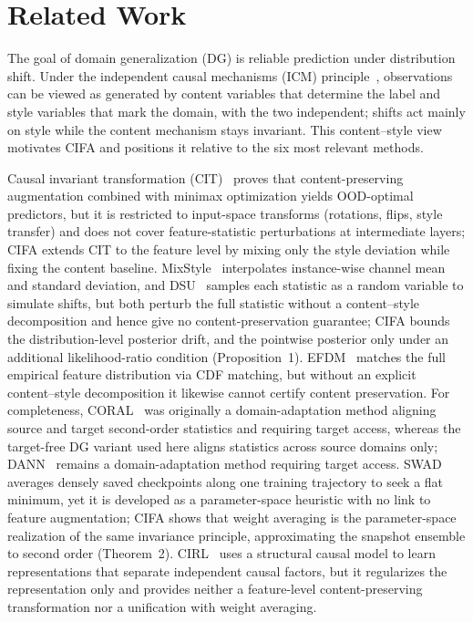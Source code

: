 \documentclass[electronics,article,submit,moreauthors]{Definitions/mdpi}
\begin{document}
\section{Related Work}

The goal of domain generalization (DG) is reliable prediction under distribution shift. Under the independent causal mechanisms (ICM) principle~\citep{ref5,ref6}, observations can be viewed as generated by content variables that determine the label and style variables that mark the domain, with the two independent; shifts act mainly on style while the content mechanism stays invariant. This content--style view motivates CIFA and positions it relative to the six most relevant methods.

Causal invariant transformation (CIT)~\citep{ref22} proves that content-preserving augmentation combined with minimax optimization yields OOD-optimal predictors, but it is restricted to input-space transforms (rotations, flips, style transfer) and does not cover feature-statistic perturbations at intermediate layers; CIFA extends CIT to the feature level by mixing only the style deviation while fixing the content baseline. MixStyle~\citep{ref14} interpolates instance-wise channel mean and standard deviation, and DSU~\citep{ref15} samples each statistic as a random variable to simulate shifts, but both perturb the full statistic without a content--style decomposition and hence give no content-preservation guarantee; CIFA bounds the distribution-level posterior drift, and the pointwise posterior only under an additional likelihood-ratio condition (Proposition~1). EFDM~\citep{ref40} matches the full empirical feature distribution via CDF matching, but without an explicit content--style decomposition it likewise cannot certify content preservation. For completeness, CORAL~\citep{ref12} was originally a domain-adaptation method aligning source and target second-order statistics and requiring target access, whereas the target-free DG variant used here aligns statistics across source domains only; DANN~\citep{ref13} remains a domain-adaptation method requiring target access. SWAD~\citep{ref18} averages densely saved checkpoints along one training trajectory to seek a flat minimum, yet it is developed as a parameter-space heuristic with no link to feature augmentation; CIFA shows that weight averaging is the parameter-space realization of the same invariance principle, approximating the snapshot ensemble to second order (Theorem~2). CIRL~\citep{ref39} uses a structural causal model to learn representations that separate independent causal factors, but it regularizes the representation only and provides neither a feature-level content-preserving transformation nor a unification with weight averaging.
\end{document}
